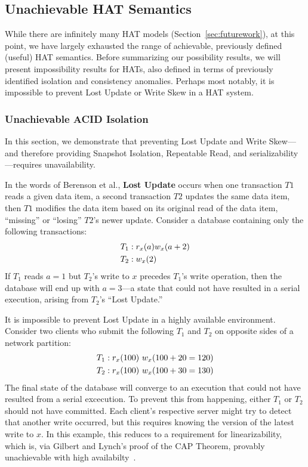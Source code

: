 \subsection{Unachievable HAT Semantics}
\label{sec:unachievable-hat}

While there are infinitely many HAT models
(Section~\ref{sec:futurework}), at this point, we have largely
exhausted the range of achievable, previously defined (useful) HAT
semantics. Before summarizing our possibility results, we will present
impossibility results for HATs, also defined in terms of previously
identified isolation and consistency anomalies. Perhaps most notably,
it is impossible to prevent Lost Update or Write Skew in a HAT system.

\subsubsection{Unachievable ACID Isolation}

In this section, we demonstrate that preventing Lost Update and Write
Skew---and therefore providing Snapshot Isolation, Repeatable Read,
and serializability---requires unavailability.

In the words of Berenson et al., \textbf{Lost Update} occurs when one
transaction $T1$ reads a given data item, a second transaction $T2$
updates the same data item, then $T1$ modifies the data item based on
its original read of the data item, ``missing'' or ``losing'' $T2$'s
newer update. Consider a database containing only the following
transactions:
\begin{align*}
\small
T_1 &: r_x(a) w_x(a+2)
\\T_2 &: w_x(2)
\end{align*}
If $T_1$ reads $a=1$ but $T_2$'s write to $x$ precedes $T_1$'s write
operation, then the database will end up with $a=3$---a state that
could not have resulted in a serial execution, arising from $T_2$'s
``Lost Update.''

It is impossible to prevent Lost Update in a highly available
environment. Consider two clients who submit the following $T_1$ and
$T_2$ on opposite sides of a network partition:
\begin{align*}
\small
T_1 &: r_x(100)~w_x(100+20=120)
\\T_2 &: r_x(100)~w_x(100+30=130)
\end{align*}
The final state of the database will converge to an execution that
could not have resulted from a serial excecution. To prevent this from
happening, either $T_1$ or $T_2$ should not have committed. Each
client's respective server might try to detect that another write
occurred, but this requires knowing the version of the latest write to
$x$. In this example, this reduces to a requirement for
linearizability, which is, via Gilbert and Lynch's proof of the CAP
Theorem, provably unachievable with high
availabilty~\cite{gilbert-cap}.

